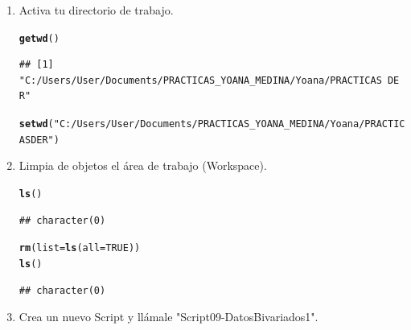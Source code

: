 \documentclass[12pt,letterpaper]{article}\usepackage[]{graphicx}\usepackage[]{color}
\makeatletter
\newcommand{\hlnum}[1]{\textcolor[rgb]{0.686,0.059,0.569}{#1}}%
\newcommand{\hlstr}[1]{\textcolor[rgb]{0.192,0.494,0.8}{#1}}%
\newcommand{\hlstd}[1]{\textcolor[rgb]{0.345,0.345,0.345}{#1}}%
\newcommand{\hlkwc}[1]{\textcolor[rgb]{0.333,0.667,0.333}{#1}}%
\newcommand{\hlkwd}[1]{\textcolor[rgb]{0.737,0.353,0.396}{\textbf{#1}}}%
\newenvironment{kframe}{%
 \def\at@end@of@kframe{}%
 \ifinner\ifhmode%
  \def\at@end@of@kframe{\end{minipage}}%
  \begin{minipage}{\columnwidth}%
 \fi\fi%
 \def\FrameCommand##1{\hskip\@totalleftmargin \hskip-\fboxsep
 \colorbox{shadecolor}{##1}\hskip-\fboxsep
     \hskip-\linewidth \hskip-\@totalleftmargin \hskip\columnwidth}%
 \MakeFramed {\advance\hsize-\width
   \@totalleftmargin\z@ \linewidth\hsize
   \@setminipage}}%
 {\par\unskip\endMakeFramed%
 \at@end@of@kframe}
\newenvironment{knitrout}{}{} %
\makeatother
\begin{document}
\begin{enumerate}
  \item Activa tu directorio de trabajo.
\begin{knitrout}
\color{fgcolor}\begin{kframe}
\begin{alltt}
\hlkwd{getwd}\hlstd{()}
\end{alltt}
\begin{verbatim}
## [1] "C:/Users/User/Documents/PRACTICAS_YOANA_MEDINA/Yoana/PRACTICAS DE R"
\end{verbatim}
\begin{alltt}
\hlkwd{setwd}\hlstd{(}\hlstr{"C:/Users/User/Documents/PRACTICAS_YOANA_MEDINA/Yoana/PRACTICAS DE R"}\hlstd{)}
\end{alltt}
\end{kframe}
\end{knitrout}

\item Limpia de objetos el \'area de trabajo (Workspace).
\begin{knitrout}
\color{fgcolor}\begin{kframe}
\begin{alltt}
\hlkwd{ls}\hlstd{()}
\end{alltt}
\begin{verbatim}
## character(0)
\end{verbatim}
\begin{alltt}
\hlkwd{rm}\hlstd{(}\hlkwc{list}\hlstd{=}\hlkwd{ls}\hlstd{(}\hlkwc{all}\hlstd{=}\hlnum{TRUE}\hlstd{))}
\hlkwd{ls}\hlstd{()}
\end{alltt}
\begin{verbatim}
## character(0)
\end{verbatim}
\end{kframe}
\end{knitrout}

\item Crea un nuevo Script y ll\'amale "Script09-DatosBivariados1".


\end{enumerate}
\end{document}
